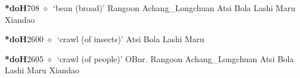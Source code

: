   \begin{list}{}{\leftmargin=1.5em \itemindent=-1.5em}
  \item {\footnotesize \textbf{*doH}}{\tiny 708}
         $\diamond$~`bean (broad)'
         Rangoon 
\hspace{1ex}
         Achang\_Longchuan 
\hspace{1ex}
         Atsi 
\hspace{1ex}
         Bola 
\hspace{1ex}
         Lashi 
\hspace{1ex}
         Maru 
\hspace{1ex}
         Xiandao 
  \item {\footnotesize \textbf{*doH}}{\tiny 2600}
\hspace{1ex}
         $\diamond$~`crawl (of insects)'
         Atsi 
\hspace{1ex}
         Bola 
\hspace{1ex}
         Lashi 
\hspace{1ex}
         Maru 
  \item {\footnotesize \textbf{*doH}}{\tiny 2605}
\hspace{1ex}
         $\diamond$~`crawl (of people)'
         OBur. 
\hspace{1ex}
         Rangoon 
\hspace{1ex}
         Achang\_Longchuan 
\hspace{1ex}
         Atsi 
\hspace{1ex}
         Bola 
\hspace{1ex}
         Lashi 
\hspace{1ex}
         Maru 
\hspace{1ex}
         Xiandao 
  \end{list}
\item
